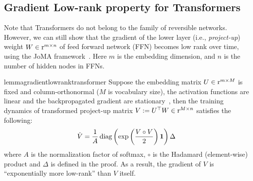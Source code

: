 \subsection{Gradient Low-rank property for Transformers}
\label{sec:transformer-low-rank}
Note that Transformers do not belong to the family of reversible networks. However, we can still show that the gradient of the lower layer (i.e., \emph{project-up}) weight $W \in {\textnormal{r}}^{m\times n}$ of feed forward network (FFN) becomes low rank over time, using the JoMA framework~\cite{tian2023joma}. Here $m$ is the embedding dimension, and $n$ is the number of hidden nodes in FFNs.
\begin{restatable}{lemma}{gradientlowranktransformer}
Suppose the embedding matrix $U \in {\textnormal{r}}^{m \times M}$ is fixed and column-orthonormal ($M$ is vocabulary size), the activation functions are linear and the backpropagated gradient are stationary~\cite{tian2023joma}, then the training dynamics of transformed project-up matrix $V := U^\top W \in {\textnormal{r}}^{M\times n}$ satisfies the following:
\begin{equation}
    \dot V = \frac{1}{A} \operatorname{diag}\left(\exp\left(\frac{V \circ V}{2}\right){\bm{1}} \right)\Delta \label{eq:V-dynamics}
\end{equation}
where $A$ is the normalization factor of softmax, $\circ$ is the Hadamard (element-wise) product and $\Delta$ is defined in the proof. As a result, the gradient of $V$ is ``exponentially more low-rank'' than $V$ itself.  
\end{restatable}
